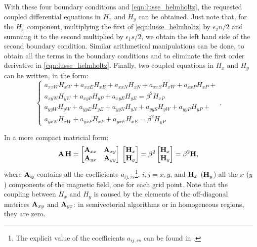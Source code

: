 With these four boundary conditions and \eqref{eqn:lusse_helmholtz},
the requested coupled differential equations in $H_x$ and $H_y$ can be
obtained. Just note that, for the $H_x$ component, multiplying the
first of \eqref{eqn:lusse_helmholtz} by $\epsilon_2 n/2$ and summing
it to the second multiplied by $\epsilon_1 s/2$, we obtain the left
hand side of the second boundary condition. Similar arithmetical
manipulations can be done, to obtain all the terms in the boundary
conditions and to eliminate the first order derivative in
\ref{eqn:lusse_helmholtz}.  Finally, two coupled equations in $H_x$
and $H_y$ can be written, in the form:
\begin{equation*} \begin{cases}
    a_{xxW} H_{xW} + a_{xxE} H_{xE} + a_{xxN} H_{xN} + a_{xxS} H_{xW}
    + a_{xxP} H_{xP} + \\
    a_{xyW} H_{yW} + a_{xyP} H_{yP} + a_{xyE} H_{yE} = \beta^2 H_{xP} \\
    a_{yyW} H_{yW} + a_{yyE} H_{yE} + a_{yyN} H_{yN} + a_{yyS} H_{yW}
    + a_{yyP} H_{yP} + \\
    a_{yxW} H_{xW} + a_{yxP} H_{xP} + a_{yxE} H_{xE} = \beta^2 H_{yP}
\end{cases} . \end{equation*}

In a more compact matricial form:
\begin{equation*}
  {\mathbf{A}\,\mathbf{H}} = {
    \begin{bmatrix}
      \mathbf{A}_{xx} & \mathbf{A}_{xy} \\
      \mathbf{A}_{yx} & \mathbf{A}_{yy}
    \end{bmatrix}
  \,
  \begin{bmatrix}
      \mathbf{H}_x \\
      \mathbf{H}_y
  \end{bmatrix}} = \beta^2
  \begin{bmatrix}
      \mathbf{H}_x \\
      \mathbf{H}_y
  \end{bmatrix} = \beta^2 \mathbf{H},
\end{equation*}
where $\mathbf{A_{ij}}$ contains all the coefficients
$a_{ij,rs}$\footnote{The explicit value of the coefficients
$a_{ij,rs}$ can be found in \cite{lusse_analysis}.}, $i,j = x,y$, and
$\mathbf{H}_x$ ($\mathbf{H}_y$) all the $x$ ($y$) components of the
magnetic field, one for each grid point. Note that the coupling
between $H_x$ and $H_y$ is caused by the elements of the off-diagonal
matrices $\mathbf{A}_{xy}$ and $\mathbf{A}_{yx}$: in semivectorial
algorithms or in homogeneous regions, they are zero.

